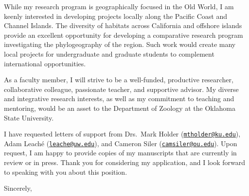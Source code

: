 \documentclass[letterpaper, 10pt]{letter}
\begin{document}
\begin{letter}


While my research program is geographically focused in the Old World, I am
keenly interested in developing projects locally along the Pacific Coast and
Channel Islands.
The diversity of habitats across California and offshore islands provide an
excellent opportunity for developing a comparative research program
investigating the phylogeography of the region.
Such work would create many local projects for undergraduate and graduate
students to complement international opportunities.


As a faculty member, I will strive to be a well-funded, productive researcher,
collaborative colleague, passionate teacher, and supportive advisor.
My diverse and integrative research interests, as well as my commitment to
teaching and mentoring, would be an asset to the Department of Zoology at the
Oklahoma State University.

I have requested letters of support from Drs.\
Mark Holder
(\href{mailto:mtholder@ku.edu}{\tt mtholder@ku.edu}),
Adam Leach\'{e}
(\href{mailto:leache@uw.edu}{\tt leache@uw.edu}),
and
Cameron Siler
(\href{mailto:camsiler@ou.edu}{\tt camsiler@ou.edu}).
Upon request, I am happy to provide copies of my manuscripts that are currently
in review or in press.
Thank you for considering my application, and I look forward to speaking with
you about this position.

\addtolength{\medskipamount}{-5pt}
\closing{Sincerely,}
\end{letter}
\end{document}
